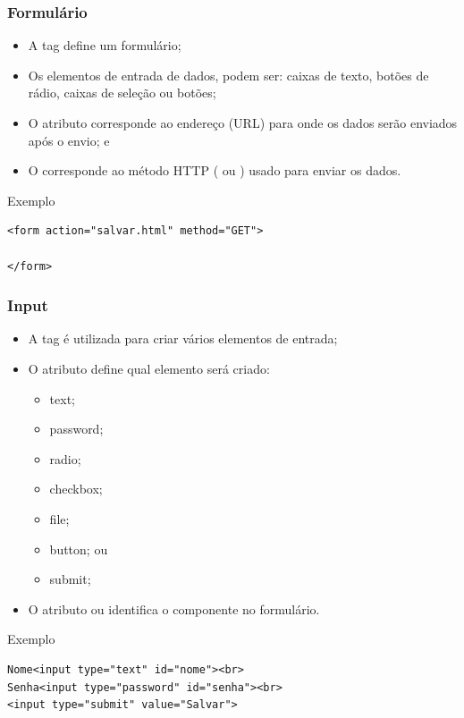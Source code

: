 \documentclass[aspectratio=169]{beamer} %
\begin{document}
\begin{frame}[fragile]
	\frametitle{Formulário}
	
	\begin{itemize}
		\item A tag  define um formulário;
		\item Os elementos de entrada de dados, podem ser: caixas de texto, botões de rádio, caixas de seleção ou botões;
		\item O atributo  corresponde ao endereço (URL) para onde os dados serão enviados após o envio; e
		\item O  corresponde ao método HTTP ( ou ) usado para enviar os dados. 
	\end{itemize}\vfill
	
	\begin{exampleblock}{Exemplo}
		\begin{lstlisting}
<form action="salvar.html" method="GET">

</form>
		\end{lstlisting}
	\end{exampleblock}
\end{frame}

\begin{frame}[fragile]
	\frametitle{Input}
	
	\begin{itemize}
		\item A tag  é utilizada para criar vários elementos de entrada;
		\item O atributo  define qual elemento será criado:
		\begin{itemize}
			\item text;
			\item password;
			\item radio;
			\item checkbox;
			\item file;
			\item button; ou
			\item submit;
		\end{itemize}
		\item O atributo  ou  identifica o componente no formulário.
	\end{itemize}\vfill
	
	\begin{exampleblock}{Exemplo}
		\begin{lstlisting}
Nome<input type="text" id="nome"><br>
Senha<input type="password" id="senha"><br>
<input type="submit" value="Salvar">
		\end{lstlisting}
	\end{exampleblock}
\end{frame}
\end{document}
